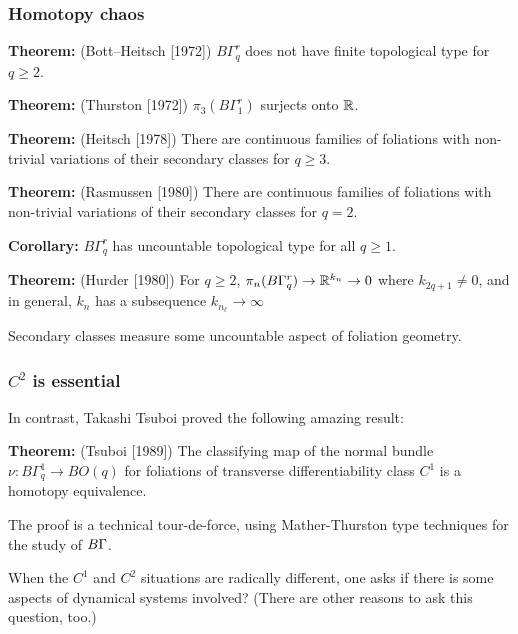 \documentclass{beamer}
\begin{document}
\frame %
{
  \frametitle{Homotopy chaos}


 

   {\bf Theorem:} (Bott--Heitsch [1972]) $B\Gamma^r_q$  does not have finite topological type for $q\geq 2$.
   
   \medskip
   \pause
 
 {\bf Theorem:} (Thurston [1972]) $\pi_3(B\Gamma^r_1)$ surjects onto ${\mathbb R}$. 
   
   \medskip
   \pause
 
 {\bf Theorem:} (Heitsch [1978]) There are continuous families of foliations with non-trivial variations of their secondary classes for $q \geq 3$. 
    
 
   \medskip
   \pause
  
 {\bf Theorem:} (Rasmussen [1980]) There are continuous families of foliations with non-trivial variations of their secondary classes for $q = 2$.  
   
   \medskip
   \pause

 {\bf Corollary:} $B\Gamma^r_q$  has uncountable topological type for all $q \geq 1$.
  
  \medskip
   \pause
 

   {\bf Theorem:} (Hurder [1980]) For $q \geq 2$, $\pi_{n}(B\Gamma^r_q) \to {\mathbb R}^{k_n} \to 0$  where $k_{2q+1} \ne 0$,   
and in general, $k_n$ has a subsequence $k_{n_{\ell}} \to \infty$

 
 \medskip
 \pause
 
 
 Secondary  classes   measure some     uncountable aspect    of  foliation geometry. 
 
 \vfill
 
}


 
\frame
{

  \frametitle{$C^{2}$ is essential}

In contrast, Takashi Tsuboi proved the following amazing result:
\medskip

{\bf Theorem:} (Tsuboi [1989]) The classifying map of the normal bundle $\nu \colon  B\Gamma^1_q \to BO(q)$
for    foliations of transverse differentiability class $C^1$  is a homotopy equivalence.

\medskip
 

The proof  is a technical tour-de-force, using Mather-Thurston type techniques for the study of $B\Gamma$.
 
 \bigskip
 
 \pause
 
 When the $C^1$ and $C^2$ situations are radically different, one asks if there is some aspects of dynamical systems involved? (There are other reasons to ask this question, too.)
 
\vfill



}
\end{document}

